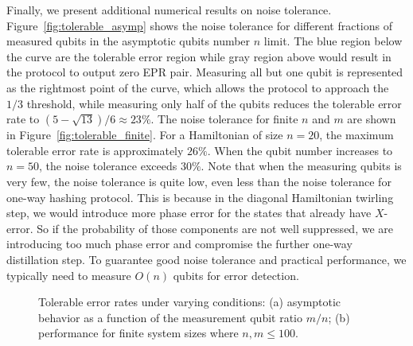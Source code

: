 \documentclass[onecolumn,prx,longbibliography,nofootinbib, superscriptaddress]{revtex4-2}
\theoremstyle{recap}
\begin{document}
Finally, we present additional numerical results on noise tolerance. Figure~\ref{fig:tolerable_asymp} shows the noise tolerance for different fractions of measured qubits in the asymptotic qubits number $n$ limit. The blue region below the curve are the tolerable error region while gray region above would result in the protocol to output zero EPR pair. Measuring all but one qubit is represented as the rightmost point of the curve, which allows the protocol to approach the $1/3$ threshold, while measuring only half of the qubits reduces the tolerable error rate to $(5-\sqrt{13})/6 \approx 23\%$. The noise tolerance for finite $n$ and $m$ are shown in Figure~\ref{fig:tolerable_finite}. For a Hamiltonian of size $n = 20$, the maximum tolerable error rate is approximately $26\%$. When the qubit number increases to $n = 50$, the noise tolerance exceeds $30\%$. Note that when the measuring qubits is very few, the noise tolerance is quite low, even less than the  noise tolerance for one-way hashing protocol. This is because in the diagonal Hamiltonian twirling step, we would introduce more phase error for the states that already have $X$-error. So if the probability of those components are not well suppressed, we are introducing too much phase error and compromise the further one-way distillation step. To guarantee good noise tolerance and practical performance, we typically need to measure $O(n)$ qubits for error detection. 

\begin{figure}[htbp]
    \centering
    \hfill %
    \caption{Tolerable error rates under varying conditions: (a) asymptotic behavior as a function of the measurement qubit ratio $m/n$; (b) performance for finite system sizes where $n, m \leq 100$.}
    \label{fig:combined_plots}
\end{figure}
\end{document}
